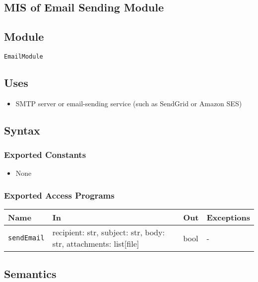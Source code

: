 \documentclass[12pt, titlepage]{article}
\begin{document}
\begin{itemize}

\section{MIS of Email Sending Module} \label{mEmail}

\subsection{Module}

\texttt{EmailModule}

\subsection{Uses}

\begin{itemize}
    \item SMTP server or email-sending service (such as SendGrid or Amazon SES)
\end{itemize}

\subsection{Syntax}

\subsubsection{Exported Constants}

\begin{itemize}
    \item None
\end{itemize}

\subsubsection{Exported Access Programs}

\begin{center}
\begin{tabular}{p{5cm} p{3.5cm} p{3.5cm} p{2cm}}
\hline
\textbf{Name} & \textbf{In} & \textbf{Out} & \textbf{Exceptions} \\
\hline
\texttt{sendEmail} & recipient: str, subject: str, body: str, attachments: list[file] & bool & - \\
\hline
\end{tabular}
\end{center}

\subsection{Semantics}


\end{itemize}
\end{document}
